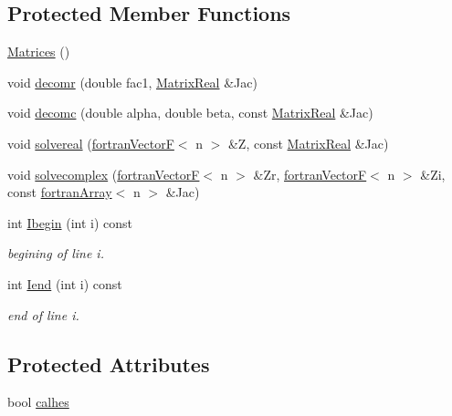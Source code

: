 \subsection*{Protected Member Functions}
\begin{DoxyCompactItemize}
\item 
\hyperlink{classodes_1_1Matrices_a8fd82bde4e3a427a677e850ecc0fbeac}{Matrices} ()
\item 
void \hyperlink{classodes_1_1Matrices_a8dc1bc6d92d06af08d4bf8fb2b357a7d}{decomr} (double fac1, \hyperlink{classodes_1_1Matrices_aa028f1e52916558a51d333ac8b081030}{Matrix\-Real} \&Jac)
\item 
void \hyperlink{classodes_1_1Matrices_a9f497885fb6dd9bb22179fab49d9b587}{decomc} (double alpha, double beta, const \hyperlink{classodes_1_1Matrices_aa028f1e52916558a51d333ac8b081030}{Matrix\-Real} \&Jac)
\item 
void \hyperlink{classodes_1_1Matrices_ace113b7bfa2377d513c2faaf645aecaa}{solvereal} (\hyperlink{classodes_1_1fortranVectorF}{fortran\-Vector\-F}$<$ n $>$ \&Z, const \hyperlink{classodes_1_1Matrices_aa028f1e52916558a51d333ac8b081030}{Matrix\-Real} \&Jac)
\item 
void \hyperlink{classodes_1_1Matrices_abce8558c305de75740568ec55e49338e}{solvecomplex} (\hyperlink{classodes_1_1fortranVectorF}{fortran\-Vector\-F}$<$ n $>$ \&Zr, \hyperlink{classodes_1_1fortranVectorF}{fortran\-Vector\-F}$<$ n $>$ \&Zi, const \hyperlink{classodes_1_1fortranArray}{fortran\-Array}$<$ n $>$ \&Jac)
\item 
int \hyperlink{classodes_1_1Matrices_a9eb26d713d3e391f60d83798337d87a6}{Ibegin} (int i) const 
\begin{DoxyCompactList}\small\item\em begining of line i. \end{DoxyCompactList}\item 
int \hyperlink{classodes_1_1Matrices_a589402cfa0e11666cd152a06e048c6f7}{Iend} (int i) const 
\begin{DoxyCompactList}\small\item\em end of line i. \end{DoxyCompactList}\end{DoxyCompactItemize}
\subsection*{Protected Attributes}
\begin{DoxyCompactItemize}
\item 
bool \hyperlink{classodes_1_1Matrices_a82e935680c27f58bcff8a559700411c6}{calhes}
\end{DoxyCompactItemize}
